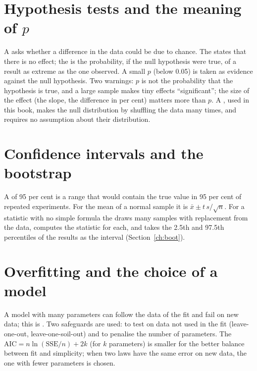 \section{Hypothesis tests and the meaning of $p$}
A  asks whether a difference in the data could be due to chance. The  states that there is no effect; the  is the probability, if the null hypothesis were true, of a result as extreme as the one observed. A small $p$ (below 0.05) is taken as evidence against the null hypothesis. Two warnings: $p$ is not the probability that the hypothesis is true, and a large sample makes tiny effects ``significant''; the size of the effect (the slope, the difference in per cent) matters more than $p$. A , used in this book, makes the null distribution by shuffling the data many times, and requires no assumption about their distribution.

\section{Confidence intervals and the bootstrap}
A  of 95 per cent is a range that would contain the true value in 95 per cent of repeated experiments. For the mean of a normal sample it is $\bar x\pm t\,s/\sqrt n$. For a statistic with no simple formula the  draws many samples with replacement from the data, computes the statistic for each, and takes the 2.5th and 97.5th percentiles of the results as the interval (Section~\ref{ch:boot}).

\section{Overfitting and the choice of a model}
A model with many parameters can follow the data of the fit and fail on new data; this is . Two safeguards are used: to test on data not used in the fit (leave-one-out, leave-one-soil-out) and to penalise the number of parameters. The  $\mathrm{AIC}=n\ln(\mathrm{SSE}/n)+2k$ (for $k$ parameters) is smaller for the better balance between fit and simplicity; when two laws have the same error on new data, the one with fewer parameters is chosen.
